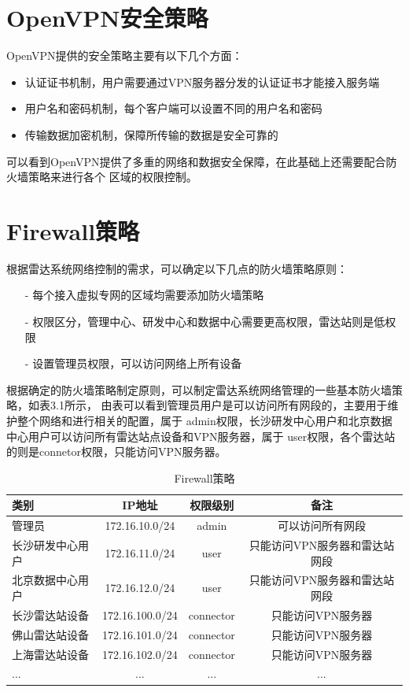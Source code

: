 \documentclass[a4paper,12pt]{report}
\begin{document}
\section{OpenVPN安全策略}
OpenVPN提供的安全策略主要有以下几个方面：
\begin{itemize}
\itemsep=3pt
\parskip=0pt
\setlength{\itemindent}{1em} 
\item 认证证书机制，用户需要通过VPN服务器分发的认证证书才能接入服务端
\item 用户名和密码机制，每个客户端可以设置不同的用户名和密码 
\item 传输数据加密机制，保障所传输的数据是安全可靠的
\end{itemize}

可以看到OpenVPN提供了多重的网络和数据安全保障，在此基础上还需要配合防火墙策略来进行各个
区域的权限控制。

\section{Firewall策略}
根据雷达系统网络控制的需求，可以确定以下几点的防火墙策略原则：
\begin{itemize}
\itemsep=3pt
\parskip=0pt
\setlength{\itemindent}{1em} 
\item[-] 每个接入虚拟专网的区域均需要添加防火墙策略
\item[-] 权限区分，管理中心、研发中心和数据中心需要更高权限，雷达站则是低权限
\item[-] 设置管理员权限，可以访问网络上所有设备
\end{itemize}

根据确定的防火墙策略制定原则，可以制定雷达系统网络管理的一些基本防火墙策略，如表3.1所示，
由表可以看到管理员用户是可以访问所有网段的，主要用于维护整个网络和进行相关的配置，属于
admin权限，长沙研发中心用户和北京数据中心用户可以访问所有雷达站点设备和VPN服务器，属于
user权限，各个雷达站的则是connetor权限，只能访问VPN服务器。
\begin{table}[H]
	\centering
	\begin{tabular}{|l|c|c|c|}
	\hline
	类别            & IP地址           & 权限级别    & 备注\\
	\hline
	管理员          & 172.16.10.0/24   & admin      & 可以访问所有网段\\
	\hline
	长沙研发中心用户 & 172.16.11.0/24   & user       & 只能访问VPN服务器和雷达站网段\\
	\hline
	北京数据中心用户 & 172.16.12.0/24   & user       & 只能访问VPN服务器和雷达站网段\\
	\hline
	长沙雷达站设备   & 172.16.100.0/24  & connector  & 只能访问VPN服务器\\
	\hline
	佛山雷达站设备   & 172.16.101.0/24  & connector  & 只能访问VPN服务器\\
	\hline
	上海雷达站设备   & 172.16.102.0/24  & connector  & 只能访问VPN服务器\\
	\hline
	...    		& ...             & ... & ...\\
	\hline
	\end{tabular}
	\caption{Firewall策略}
	\label{tab:FirewallPolicy }
\end{table}
\end{document}
